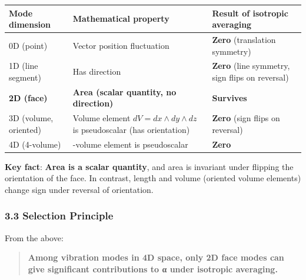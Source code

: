 \documentclass[
  11pt]{article}
\newcounter{none} %
\begin{document}
{\def\LTcaptype{none} %
\begin{longtable}[]{@{}
  >{\raggedright\arraybackslash}p{}
  >{\raggedright\arraybackslash}p{}
  >{\raggedright\arraybackslash}p{}@{}}
\toprule\noalign{}
\begin{minipage}[b]{\linewidth}\raggedright
Mode dimension
\end{minipage} & \begin{minipage}[b]{\linewidth}\raggedright
Mathematical property
\end{minipage} & \begin{minipage}[b]{\linewidth}\raggedright
Result of isotropic averaging
\end{minipage} \\
\midrule\noalign{}
\endhead
\bottomrule\noalign{}
\endlastfoot
0D (point) & Vector position fluctuation & \textbf{Zero} (translation
symmetry) \\
1D (line segment) & Has direction & \textbf{Zero} (line symmetry, sign
flips on reversal) \\
\textbf{2D (face)} & \textbf{Area (scalar quantity, no direction)} &
\textbf{Survives} \\
3D (volume, oriented) & Volume element \(dV = dx \wedge dy \wedge dz\)
is pseudoscalar (has orientation) & \textbf{Zero} (sign flips on
reversal) \\
4D (4-volume) & 4-volume element is pseudoscalar & \textbf{Zero} \\
\end{longtable}
}

\textbf{Key fact}: \textbf{Area is a scalar quantity}, and area is
invariant under flipping the orientation of the face. In contrast,
length and volume (oriented volume elements) change sign under reversal
of orientation.

\subsubsection{3.3 Selection Principle}\label{selection-principle}

From the above:

\begin{quote}
\textbf{Among vibration modes in 4D space, only 2D face modes can give
significant contributions to α under isotropic averaging.}
\end{quote}
\end{document}
